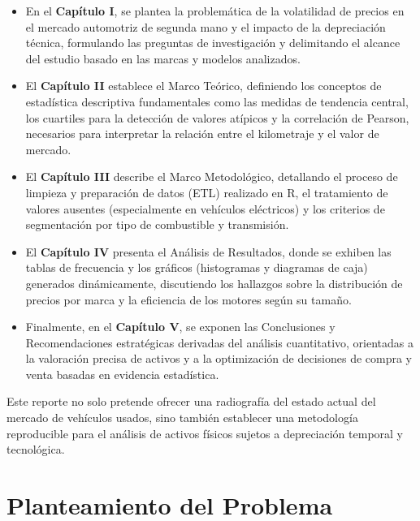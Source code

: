 \documentclass[oneside,11pt]{Latex/Classes/PhDthesisPSnPDF}
\begin{document}
\begin{itemize}
    
    \item En el \textbf{Capítulo I}, se plantea la problemática de la volatilidad de precios en el mercado automotriz de segunda mano y el impacto de la depreciación técnica, formulando las preguntas de investigación y delimitando el alcance del estudio basado en las marcas y modelos analizados.
    
    \item El \textbf{Capítulo II} establece el Marco Teórico, definiendo los conceptos de estadística descriptiva fundamentales como las medidas de tendencia central, los cuartiles para la detección de valores atípicos y la correlación de Pearson, necesarios para interpretar la relación entre el kilometraje y el valor de mercado.

    \item El \textbf{Capítulo III} describe el Marco Metodológico, detallando el proceso de limpieza y preparación de datos (ETL) realizado en R, el tratamiento de valores ausentes (especialmente en vehículos eléctricos) y los criterios de segmentación por tipo de combustible y transmisión.

    \item El \textbf{Capítulo IV} presenta el Análisis de Resultados, donde se exhiben las tablas de frecuencia y los gráficos (histogramas y diagramas de caja) generados dinámicamente, discutiendo los hallazgos sobre la distribución de precios por marca y la eficiencia de los motores según su tamaño.

    \item Finalmente, en el \textbf{Capítulo V}, se exponen las Conclusiones y Recomendaciones estratégicas derivadas del análisis cuantitativo, orientadas a la valoración precisa de activos y a la optimización de decisiones de compra y venta basadas en evidencia estadística.
\end{itemize}

Este reporte no solo pretende ofrecer una radiografía del estado actual
del mercado de vehículos usados, sino también establecer una metodología
reproducible para el análisis de activos físicos sujetos a depreciación
temporal y tecnológica.

\chapter{Planteamiento del Problema}
\end{document}
